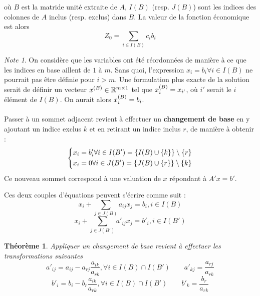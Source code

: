 \documentclass[a4paper]{report}
\theoremstyle{definition}
\theoremstyle{remark}
\newtheorem*{note}{Note}
\theoremstyle{plain}
\newtheorem{theorem}{Théorème}
\begin{document}
où $B$ est la matride unité extraite de \(A\), $I(B)$ (resp. $J(B)$) sont les
indices des colonnes de $A$ inclus (resp. exclus) dans $B$. La valeur de la
fonction économique est alors
\[Z_0=\sum_{i\in I(B)}c_ib_i\]

\begin{note}
On considère que les variables ont été réordonnées de manière à ce que les
indices en base aillent de \(1\) à \(m\). Sans quoi, l'expression \(x_i =
b_i\forall i \in I(B)\) ne pourrait pas être définie pour \(i > m\). Une
formulation plus exacte de la solution serait de définir un vecteur
\(x^{\text(B)}\in\mathbb{R}^{m\times 1}\) tel que \(x^{\text(B)}_i=x_{i'}\), où
\(i'\) serait le \(i\)\ieme élément de \(I(B)\). On aurait alors
\(x^{\text(B)}_i=b_i\).
\end{note}

\paragraph{}
Passer à un sommet adjacent revient à effectuer un \textbf{changement de base}
en y ajoutant un indice exclus $k$ et en retirant un indice inclus $r$, de
manière à obtenir :
\[\begin{dcases}
	x_i = b'_i\forall i \in I(B') = \{ I(B) \cup \{k\} \} \setminus \{r\} \\
	x_i = 0 \forall i \in J(B') = \{ J(B) \cup \{r\} \} \setminus \{k\}
\end{dcases}\]
Ce nouveau sommet correspond à une valuation de $x$ répondant à $A'x = b'$.

Ces deux couples d'équations peuvent s'écrire comme suit :
\begin{equation}
\label{eq:base-general}
x_i + \sum_{j \in J(B)}{a_{ij}x_j} = b_i , i \in I(B)
\end{equation}
\begin{equation}
\label{eq:base'-general}
x_i + \sum_{j \in J(B')}{a'_{ij}x_j} = b'_i , i \in I(B')
\end{equation}

\begin{theorem}
Appliquer un changement de base revient à effectuer les transformations suivantes
\[a'_{ij} = a_{ij} - a_{rj} \frac{a_{ik}}{a_{rk}}, \forall i \in I(B) \cap I(B') \qquad a'_{kj} = \frac{a_{rj}}{a_{rk}}\]
\[b'_i = b_i - b_r \frac{a_{ik}}{a_{rk}}, \forall i \in I(B) \cap I(B') \qquad b'_{k} = \frac{b_r}{a_{rk}}\]
\end{theorem}
\end{document}

